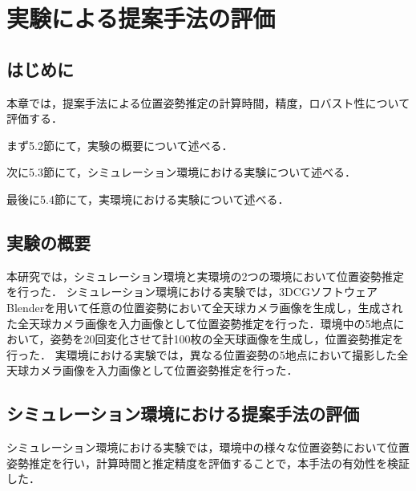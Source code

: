 \chapter{実験による提案手法の評価}
\thispagestyle{empty}
\label{chap5}
\minitoc

\newpage
\section{はじめに}

本章では，提案手法による位置姿勢推定の計算時間，精度，ロバスト性について評価する．

まず5.2節にて，実験の概要について述べる．

次に5.3節にて，シミュレーション環境における実験について述べる．

最後に5.4節にて，実環境における実験について述べる．

\clearpage
\section{実験の概要}

本研究では，シミュレーション環境と実環境の2つの環境において位置姿勢推定を行った．
シミュレーション環境における実験では，3DCGソフトウェアBlender\mbox{\cite{Blender}}を用いて任意の位置姿勢において全天球カメラ画像を生成し，生成された全天球カメラ画像を入力画像として位置姿勢推定を行った．環境中の5地点において，姿勢を20回変化させて計100枚の全天球画像を生成し，位置姿勢推定を行った．
実環境における実験では，異なる位置姿勢の5地点において撮影した全天球カメラ画像を入力画像として位置姿勢推定を行った．

\clearpage
\section{シミュレーション環境における提案手法の評価}

シミュレーション環境における実験では，環境中の様々な位置姿勢において位置姿勢推定を行い，計算時間と推定精度を評価することで，本手法の有効性を検証した．

